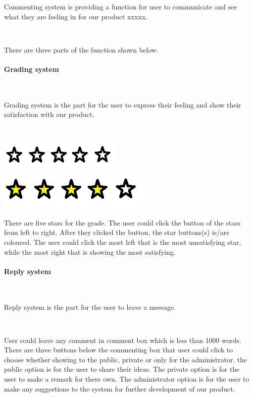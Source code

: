 Commenting system is providing a function for user to communicate and see what they are feeling in for our product xxxxx.\par~

There are three parts of the function shown below.

\paragraph{Grading system}~

Grading system is the part for the user to express their feeling and show their satisfaction with our product.\par~

\includegraphics[scale=0.7]{Doc/Graphics/0star}

\includegraphics[scale=0.56]{Doc/Graphics/4star}

There are five stars for the grade. The user could click the button of the stars from left to right. After they clicked the button, the star buttons(s) is/are coloured. The user could click the most left that is the most unsatisfying star, while the most right that is showing the most satisfying.

\paragraph{Reply system}~

Reply system is the part for the user to leave a message.\par~

User could leave any comment in comment box which is less than 1000 words. There are three buttons below the commenting box that user could click to choose whether showing to the public, private or only for the administrator. the public option is for the user to share their ideas. The private option is for the user to make a remark for there own. The administrator option is for the user to make any suggestions to the system for further development of our product.

